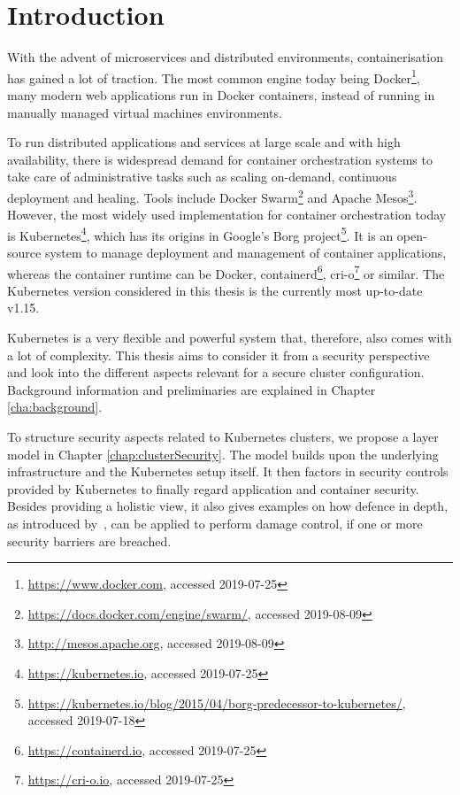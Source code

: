 
\chapter{Introduction}


With the advent of microservices and distributed environments, containerisation has gained a lot of traction. The most common engine today being Docker\footnote{\url{https://www.docker.com}, accessed 2019-07-25}, many modern web applications run in Docker containers, instead of running in manually managed virtual machines environments. 

To run distributed applications and services at large scale and with high availability, there is widespread demand for container orchestration systems to take care of administrative tasks such as scaling on-demand, continuous deployment and healing. Tools include Docker Swarm\footnote{\url{https://docs.docker.com/engine/swarm/}, accessed 2019-08-09} and Apache Mesos\footnote{\url{http://mesos.apache.org}, accessed 2019-08-09}. However, the most widely used implementation for container orchestration today is Kubernetes\footnote{\url{https://kubernetes.io}, accessed 2019-07-25}, which has its origins in Google’s Borg project\footnote{\url{https://kubernetes.io/blog/2015/04/borg-predecessor-to-kubernetes/}, accessed 2019-07-18}. It is an open-source system to manage deployment and management of container applications, whereas the container runtime can be Docker, containerd\footnote{\url{https://containerd.io}, accessed 2019-07-25}, cri-o\footnote{\url{https://cri-o.io}, accessed 2019-07-25} or similar. The Kubernetes version considered in this thesis is the currently most up-to-date v1.15.

Kubernetes is a very flexible and powerful system that, therefore, also comes with a lot of complexity. This thesis aims to consider it from a security perspective and look into the different aspects relevant for a secure cluster configuration. Background information and preliminaries are explained in Chapter \ref{cha:background}.

To structure security aspects related to Kubernetes clusters, we propose a layer model in Chapter \ref{chap:clusterSecurity}. The model builds upon the underlying infrastructure and the Kubernetes setup itself. It then factors in security controls provided by Kubernetes to finally regard application and container security. Besides providing a holistic view, it also gives examples on how defence in depth, as introduced by~\textcite{defenceInDepth}, can be applied to perform damage control, if one or more security barriers are breached.


